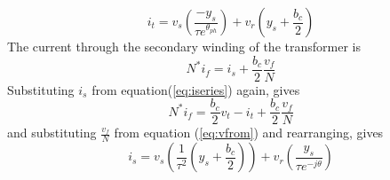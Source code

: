 \begin{equation}
\label{eq:ito}
i_t = v_s \left( \frac{-y_s}{\tau e^{\theta_{ph}}} \right) +
v_r \left( y_s + \frac{b_c}{2} \right)
\end{equation}
The current through the secondary winding of the transformer is
\begin{equation}
N^*i_f = i_s + \frac{b_c}{2}\frac{v_{f}}{N}
\end{equation}
Substituting $i_s$ from equation(\ref{eq:iseries}) again, gives
\begin{equation}
N^*i_f = \frac{b_c}{2}v_t - i_t + \frac{b_c}{2}\frac{v_{f}}{N}
\end{equation}
and substituting $\frac{v_{f}}{N}$ from equation (\ref{eq:vfrom}) and
rearranging, gives
\begin{equation}
\label{eq:ifrom}
i_s = v_s \left( \frac{1}{\tau^2} \left(y_s + \frac{b_c}{2}\right) \right) +
v_r \left(\frac{y_s}{\tau e^{-j\theta}}\right)
\end{equation}

%

